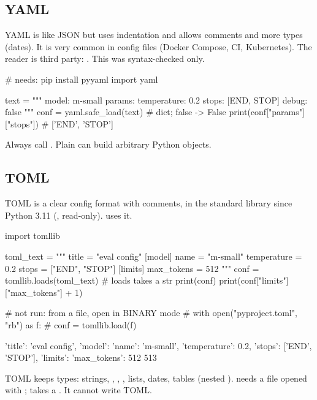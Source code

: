 \subsection{YAML}

YAML is like JSON but uses indentation and allows comments and more types (dates). It is
very common in config files (Docker Compose, CI, Kubernetes). The reader is third party:
. This was syntax-checked only.

\begin{pycode}
# needs: pip install pyyaml
import yaml

text = """
model: m-small
params:
  temperature: 0.2
  stops: [END, STOP]
debug: false
"""
conf = yaml.safe_load(text)            # dict; false -> False
print(conf["params"]["stops"])         # ['END', 'STOP']
\end{pycode}

\begin{trap}
Always call . Plain  can build arbitrary Python objects.
\end{trap}

\subsection{TOML}

TOML is a clear config format with comments, in the standard library since Python 3.11
(, read-only).  uses it.

\begin{pycode}
import tomllib

toml_text = """
title = "eval config"
[model]
name = "m-small"
temperature = 0.2
stops = ["END", "STOP"]
[limits]
max_tokens = 512
"""
conf = tomllib.loads(toml_text)         # loads takes a str
print(conf)
print(conf["limits"]["max_tokens"] + 1)

# not run: from a file, open in BINARY mode
# with open("pyproject.toml", "rb") as f:
#     conf = tomllib.load(f)
\end{pycode}
\begin{rawcode}
{'title': 'eval config', 'model': {'name': 'm-small', 'temperature': 0.2, 'stops': ['END', 'STOP']}, 'limits': {'max_tokens': 512}}
513
\end{rawcode}

\begin{typecheck}
TOML keeps types: strings, , , , lists, dates, tables
(nested ).  needs a file opened with ;
 takes a . It cannot write TOML.
\end{typecheck}

